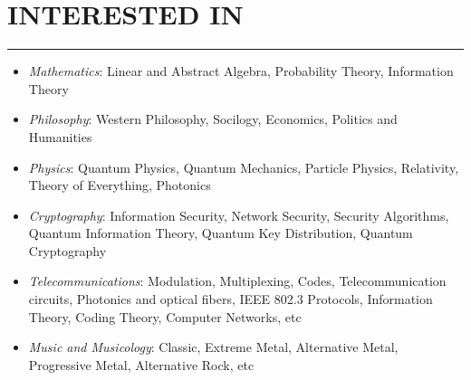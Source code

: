 \documentclass[10pt,a4paper]{article}
\begin{document}

\section{INTERESTED IN}
\noindent \rule {3.2cm}{0.4pt}
  \begin{itemize}
    \setlength{\rightskip}{2cm}
    \setlength\itemsep{0em}
    \item \small \textit{Mathematics}: Linear and Abstract Algebra, Probability Theory, Information Theory
	  \item \small \textit{Philosophy}: Western Philosophy, Socilogy, Economics, Politics and Humanities
	  \item \small \textit{Physics}: Quantum Physics, Quantum Mechanics, Particle Physics, Relativity, Theory of Everything, Photonics 
	  \item \small \textit{Cryptography}: Information Security, Network Security, Security Algorithms, Quantum Information Theory, Quantum Key Distribution, Quantum Cryptography 
	  \item \small \textit{Telecommunications}: Modulation, Multiplexing, Codes, Telecommunication circuits, Photonics and optical fibers, IEEE 802.3 Protocols, Information Theory, Coding Theory, Computer Networks, etc 
    \item \small \textit{Music and Musicology}: Classic, Extreme Metal, Alternative Metal, Progressive Metal, Alternative Rock, etc
  \end{itemize}
\end{document}
